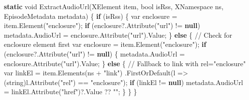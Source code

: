\documentclass[
  letterpaper,
  DIV=11,
  numbers=noendperiod]{scrartcl}
\newenvironment{Shaded}{\begin{snugshade}}{\end{snugshade}}
\newcommand{\CommentTok}[1]{\textcolor[rgb]{0.37,0.37,0.37}{#1}}
\newcommand{\DataTypeTok}[1]{\textcolor[rgb]{0.68,0.00,0.00}{#1}}
\newcommand{\FunctionTok}[1]{\textcolor[rgb]{0.28,0.35,0.67}{#1}}
\newcommand{\KeywordTok}[1]{\textcolor[rgb]{0.00,0.23,0.31}{\textbf{#1}}}
\newcommand{\NormalTok}[1]{\textcolor[rgb]{0.00,0.23,0.31}{#1}}
\newcommand{\OperatorTok}[1]{\textcolor[rgb]{0.37,0.37,0.37}{#1}}
\newcommand{\StringTok}[1]{\textcolor[rgb]{0.13,0.47,0.30}{#1}}
\begin{document}
\begin{Shaded}
\begin{Highlighting}[]
    \KeywordTok{static} \DataTypeTok{void} \FunctionTok{ExtractAudioUrl}\OperatorTok{(}\NormalTok{XElement item}\OperatorTok{,} \DataTypeTok{bool}\NormalTok{ isRss}\OperatorTok{,}\NormalTok{ XNamespace ns}\OperatorTok{,}\NormalTok{ EpisodeMetadata metadata}\OperatorTok{)}
    \OperatorTok{\{}
        \KeywordTok{if} \OperatorTok{(}\NormalTok{isRss}\OperatorTok{)}
        \OperatorTok{\{}
            \DataTypeTok{var}\NormalTok{ enclosure }\OperatorTok{=}\NormalTok{ item}\OperatorTok{.}\FunctionTok{Element}\OperatorTok{(}\StringTok{"enclosure"}\OperatorTok{);}
            \KeywordTok{if} \OperatorTok{(}\NormalTok{enclosure}\OperatorTok{?.}\FunctionTok{Attribute}\OperatorTok{(}\StringTok{"url"}\OperatorTok{)} \OperatorTok{!=} \KeywordTok{null}\OperatorTok{)}
\NormalTok{                metadata}\OperatorTok{.}\FunctionTok{AudioUrl} \OperatorTok{=}\NormalTok{ enclosure}\OperatorTok{.}\FunctionTok{Attribute}\OperatorTok{(}\StringTok{"url"}\OperatorTok{).}\FunctionTok{Value}\OperatorTok{;}
        \OperatorTok{\}}
        \KeywordTok{else}
        \OperatorTok{\{}
            \CommentTok{// Check for enclosure element first}
            \DataTypeTok{var}\NormalTok{ enclosure }\OperatorTok{=}\NormalTok{ item}\OperatorTok{.}\FunctionTok{Element}\OperatorTok{(}\StringTok{"enclosure"}\OperatorTok{);}
            \KeywordTok{if} \OperatorTok{(}\NormalTok{enclosure}\OperatorTok{?.}\FunctionTok{Attribute}\OperatorTok{(}\StringTok{"url"}\OperatorTok{)} \OperatorTok{!=} \KeywordTok{null}\OperatorTok{)}
            \OperatorTok{\{}
\NormalTok{                metadata}\OperatorTok{.}\FunctionTok{AudioUrl} \OperatorTok{=}\NormalTok{ enclosure}\OperatorTok{.}\FunctionTok{Attribute}\OperatorTok{(}\StringTok{"url"}\OperatorTok{).}\FunctionTok{Value}\OperatorTok{;}
            \OperatorTok{\}}
            \KeywordTok{else}
            \OperatorTok{\{}
                \CommentTok{// Fallback to link with rel="enclosure"}
                \DataTypeTok{var}\NormalTok{ linkEl }\OperatorTok{=}\NormalTok{ item}\OperatorTok{.}\FunctionTok{Elements}\OperatorTok{(}\NormalTok{ns }\OperatorTok{+} \StringTok{"link"}\OperatorTok{)}
                                 \OperatorTok{.}\FunctionTok{FirstOrDefault}\OperatorTok{(}\NormalTok{l }\OperatorTok{=\textgreater{}} \OperatorTok{(}\DataTypeTok{string}\OperatorTok{)}\NormalTok{l}\OperatorTok{.}\FunctionTok{Attribute}\OperatorTok{(}\StringTok{"rel"}\OperatorTok{)} \OperatorTok{==} \StringTok{"enclosure"}\OperatorTok{);}
                \KeywordTok{if} \OperatorTok{(}\NormalTok{linkEl }\OperatorTok{!=} \KeywordTok{null}\OperatorTok{)}
\NormalTok{                    metadata}\OperatorTok{.}\FunctionTok{AudioUrl} \OperatorTok{=}\NormalTok{ linkEl}\OperatorTok{.}\FunctionTok{Attribute}\OperatorTok{(}\StringTok{"href"}\OperatorTok{)?.}\FunctionTok{Value} \OperatorTok{??} \StringTok{""}\OperatorTok{;}
            \OperatorTok{\}}
        \OperatorTok{\}}
    \OperatorTok{\}}


\end{Highlighting}
\end{Shaded}
\end{document}
